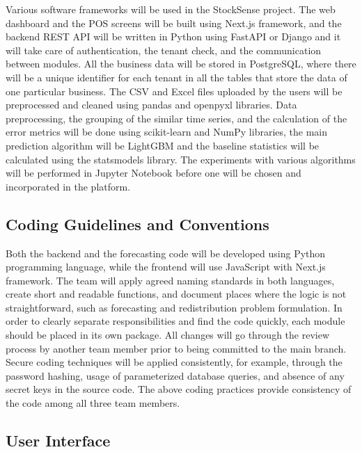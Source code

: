 \documentclass{StockSense}
\begin{document}
Various software frameworks will be used in the StockSense project. The web dashboard and the POS screens will be built using Next.js framework, and the backend REST API will be written in Python using FastAPI or Django and it will take care of authentication, the tenant check, and the communication between modules. All the business data will be stored in PostgreSQL, where there will be a unique identifier for each tenant in all the tables that store the data of one particular business. The CSV and Excel files uploaded by the users will be preprocessed and cleaned using pandas and openpyxl libraries. Data preprocessing, the grouping of the similar time series, and the calculation of the error metrics will be done using scikit-learn and NumPy libraries, the main prediction algorithm will be LightGBM and the baseline statistics will be calculated using the statsmodels library. The experiments with various algorithms will be performed in Jupyter Notebook before one will be chosen and incorporated in the platform.

\subsection{Coding Guidelines and Conventions}

Both the backend and the forecasting code will be developed using Python programming language, while the frontend will use JavaScript with Next.js framework. The team will apply agreed naming standards in both languages, create short and readable functions, and document places where the logic is not straightforward, such as forecasting and redistribution problem formulation. In order to clearly separate responsibilities and find the code quickly, each module should be placed in its own package. All changes will go through the review process by another team member prior to being committed to the main branch. Secure coding techniques will be applied consistently, for example, through the password hashing, usage of parameterized database queries, and absence of any secret keys in the source code. The above coding practices provide consistency of the code among all three team members.

\subsection{User Interface}
\end{document}
